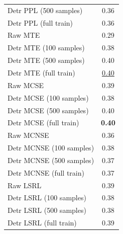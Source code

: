 \begin{table}
\begin{tabular}{lc}
Detr PPL (500 samples) & 0.36 \\
Detr PPL (full train) & 0.36 \\
\midrule
Raw MTE & 0.29 \\
Detr MTE (100 samples) & 0.38 \\
Detr MTE (500 samples) & 0.40 \\
Detr MTE (full train) & \underline{0.40} \\
\midrule
Raw MCSE & 0.39 \\
Detr MCSE (100 samples) & 0.38 \\
Detr MCSE (500 samples) & 0.40 \\
Detr MCSE (full train) & \textbf{0.40} \\
\midrule
Raw MCNSE & 0.36 \\
Detr MCNSE (100 samples) & 0.38 \\
Detr MCNSE (500 samples) & 0.37 \\
Detr MCNSE (full train) & 0.37 \\
\midrule
Raw LSRL & 0.39 \\
Detr LSRL (100 samples) & 0.38 \\
Detr LSRL (500 samples) & 0.38 \\
Detr LSRL (full train) & 0.39 \\
\midrule
\midrule
\end{tabular}
\end{table}
